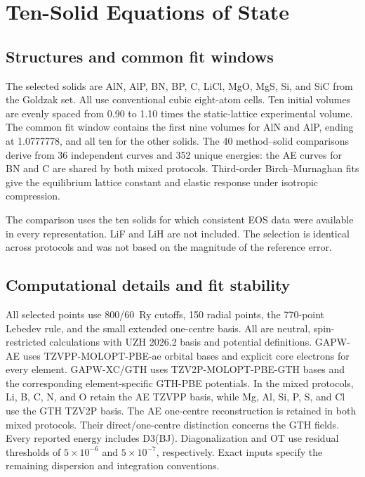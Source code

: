 \section{Ten-Solid Equations of State}
\label{sec:solids}

\subsection{Structures and common fit windows}
\label{sec:solid-structures}

The selected solids are AlN, AlP, BN, BP, C, LiCl, MgO, MgS, Si, and SiC from the Goldzak set.\cite{Goldzak2022Solids} All use conventional cubic eight-atom cells. Ten initial volumes are evenly spaced from 0.90 to 1.10 times the static-lattice experimental volume. The common fit window contains the first nine volumes for AlN and AlP, ending at 1.0777778, and all ten for the other solids. The 40 method--solid comparisons derive from 36 independent curves and 352 unique energies: the AE curves for BN and C are shared by both mixed protocols. Third-order Birch--Murnaghan fits give the equilibrium lattice constant and elastic response under isotropic compression.

The comparison uses the ten solids for which consistent EOS data were available in every representation. LiF and LiH are not included. The selection is identical across protocols and was not based on the magnitude of the reference error.

\subsection{Computational details and fit stability}
\label{sec:solid-settings}

All selected points use 800/60~Ry cutoffs, 150 radial points, the 770-point Lebedev rule, and the small extended one-centre basis. All are neutral, spin-restricted calculations with UZH 2026.2 basis and potential definitions.\cite{Mirhosseini2026UZH} GAPW-AE uses TZVPP-MOLOPT-PBE-ae orbital bases and explicit core electrons for every element. GAPW-XC/GTH uses TZV2P-MOLOPT-PBE-GTH bases and the corresponding element-specific GTH-PBE potentials. In the mixed protocols, Li, B, C, N, and O retain the AE TZVPP basis, while Mg, Al, Si, P, S, and Cl use the GTH TZV2P basis. The AE one-centre reconstruction is retained in both mixed protocols. Their direct/one-centre distinction concerns the GTH fields. Every reported energy includes D3(BJ). Diagonalization and OT use residual thresholds of $5\times10^{-6}$ and $5\times10^{-7}$, respectively. Exact inputs specify the remaining dispersion and integration conventions.

